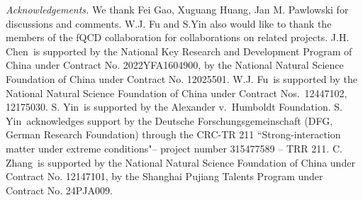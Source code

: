 \documentclass[aps,twocolumn,prd,superscriptaddress,nofootinbib,floatfix]{revtex4-2}
\begin{document}
\textit{Acknowledgements.} We thank Fei Gao,  Xuguang Huang, Jan M. Pawlowski for discussions and comments. W.J. Fu and S.Yin also would like to thank the members of the fQCD collaboration \cite{fQCD} for collaborations on related projects.
J.H. Chen\ is supported by the National Key Research and Development Program of China under Contract No. 2022YFA1604900, by the National Natural Science Foundation of China under Contract No. 12025501.
W.J. Fu\ is supported by the National Natural Science Foundation of China under Contract Nos.\ 12447102, 12175030. 
S. Yin\ is supported by the Alexander v.\ Humboldt Foundation. 
S. Yin\ acknowledges support by the Deutsche Forschungsgemeinschaft (DFG, German Research Foundation) through the CRC-TR 211 ``Strong-interaction matter under extreme conditions"– project number 315477589 – TRR 211.
C. Zhang\ is supported by the National Natural Science Foundation of China under Contract No. 12147101, by the Shanghai Pujiang Talents Program under Contract No. 24PJA009.

% 

\vfill 


\end{document}
